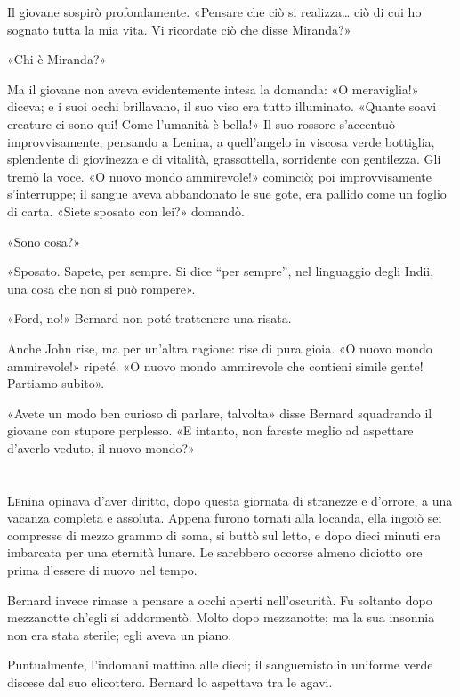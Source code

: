 \documentclass[
a5paper, %
10pt, %
twoside, 
onecolumn, %
openany, %
]{memoir}
\begin{document}
Il giovane sospirò profondamente. «Pensare che ciò si realizza… ciò di cui ho sognato tutta la mia vita. Vi ricordate ciò che disse Miranda?»

«Chi è Miranda?»

Ma il giovane non aveva evidentemente intesa la domanda: «O meraviglia!» diceva; e i suoi occhi brillavano, il suo viso era tutto illuminato. «Quante soavi creature ci sono qui! Come l’umanità è bella!» Il suo rossore s’accentuò improvvisamente, pensando a Lenina, a quell’angelo in viscosa verde bottiglia, splendente di giovinezza e di vitalità, grassottella, sorridente con gentilezza. Gli tremò la voce. «O nuovo mondo ammirevole!» cominciò; poi improvvisamente s’interruppe; il sangue aveva abbandonato le sue gote, era pallido come un foglio di carta. «Siete sposato con lei?» domandò.

«Sono cosa?»

«Sposato. Sapete, per sempre. Si dice “per sempre”, nel linguaggio degli Indii, una cosa che non si può rompere».

«Ford, no!» Bernard non poté trattenere una risata.

Anche John rise, ma per un’altra ragione: rise di pura gioia. «O nuovo mondo ammirevole!» ripeté. «O nuovo mondo ammirevole che contieni simile gente! Partiamo subito».

«Avete un modo ben curioso di parlare, talvolta» disse Bernard squadrando il giovane con stupore perplesso. «E intanto, non fareste meglio ad aspettare d’averlo veduto, il nuovo mondo?»

\chapter{\phantom{title}}

\lettrine{L}enina opinava d’aver diritto, dopo questa giornata di stranezze e d’orrore, a una vacanza completa e assoluta. Appena furono tornati alla locanda, ella ingoiò sei compresse di mezzo grammo di soma, si buttò sul letto, e dopo dieci minuti era imbarcata per una eternità lunare. Le sarebbero occorse almeno diciotto ore prima d’essere di nuovo nel tempo.

Bernard invece rimase a pensare a occhi aperti nell’oscurità. Fu soltanto dopo mezzanotte ch’egli si addormentò. Molto dopo mezzanotte; ma la sua insonnia non era stata sterile; egli aveva un piano.

Puntualmente, l’indomani mattina alle dieci; il sanguemisto in uniforme verde discese dal suo elicottero. Bernard lo aspettava tra le agavi.
\end{document}
